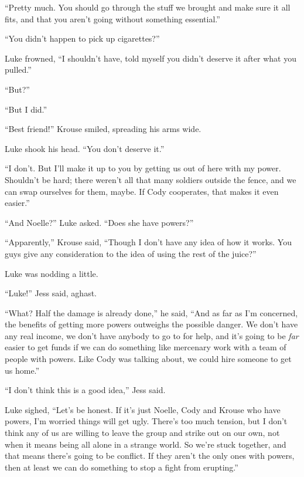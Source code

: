 ``Pretty much.  You should go through the stuff we brought and make sure it all fits, and that you aren't going without something essential.''



``You didn't happen to pick up cigarettes?''



Luke frowned, ``I shouldn't have, told myself you didn't deserve it after what you pulled.''



``But?''



``But I did.''



``Best friend!'' Krouse smiled, spreading his arms wide.



Luke shook his head.  ``You don't deserve it.''



``I don't.  But I'll make it up to you by getting us out of here with my power.  Shouldn't be hard; there weren't all that many soldiers outside the fence, and we can swap ourselves for them, maybe.  If Cody cooperates, that makes it even easier.''



``And Noelle?'' Luke asked.  ``Does she have powers?''



``Apparently,'' Krouse said, ``Though I don't have any idea of how it works.  You guys give any consideration to the idea of using the rest of the juice?''



Luke was nodding a little.



``Luke!'' Jess said, aghast.



``What?  Half the damage is already done,'' he said, ``And as far as I'm concerned, the benefits of getting more powers outweighs the possible danger.  We don't have any real income, we don't have anybody to go to for help, and it's going to be \emph{far} easier to get funds if we can do something like mercenary work with a team of people with powers.  Like Cody was talking about, we could hire someone to get us home.''



``I don't think this is a good idea,'' Jess said.



Luke sighed, ``Let's be honest.  If it's just Noelle, Cody and Krouse who have powers, I'm worried things will get ugly.  There's too much tension, but I don't think any of us are willing to leave the group and strike out on our own, not when it means being all alone in a strange world.  So we're stuck together, and that means there's going to be conflict.  If they aren't the only ones with powers, then at least we can do something to stop a fight from erupting.''



